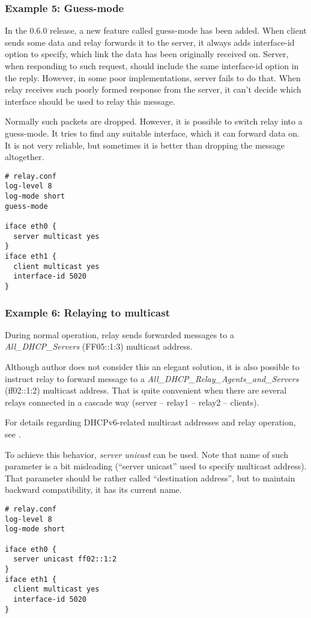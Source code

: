 \subsubsection{Example 5: Guess-mode}
In the 0.6.0 release, a new feature called guess-mode has been
added. When client sends some data and relay forwards it to the
server, it always adds interface-id option to specify, which link
the data has been originally received on. Server, when responding to
such request, should include the same interface-id option in the
reply. However, in some poor implementations, server fails to do
that. When relay receives such poorly formed response from the server,
it can't decide which interface should be used to relay this
message. 

Normally such packets are dropped. However, it is possible to switch
relay into a guess-mode. It tries to find any suitable interface,
which it can forward data on. It is not very reliable, but sometimes
it is better than dropping the message altogether.

\begin{lstlisting}
# relay.conf
log-level 8
log-mode short
guess-mode

iface eth0 {
  server multicast yes
}
iface eth1 {
  client multicast yes
  interface-id 5020
}
\end{lstlisting}

\subsubsection{Example 6: Relaying to multicast}
During normal operation, relay sends forwarded messages to a 
\emph{All\_DHCP\_Servers} (FF05::1:3) multicast address.

Although author does not consider this an elegant solution, it is also 
possible to instruct relay to forward message to a \emph{All\_DHCP\_Relay\_Agents\_and\_Servers}
(ff02::1:2) multicast address. That is quite convenient when there are several 
relays connected in a cascade way (server -- relay1 -- relay2 -- clients).

For details regarding DHCPv6-related multicast addresses and relay operation, see \cite{rfc3315}.

To achieve this behavior, \emph{server unicast} can be used. Note that
name of such parameter is a bit misleading (``server unicast'' used to specify
multicast address). That parameter should be rather called ``destination address'', 
but to maintain backward compatibility, it has its current name.

\begin{lstlisting}
# relay.conf
log-level 8
log-mode short

iface eth0 {
  server unicast ff02::1:2
}
iface eth1 {
  client multicast yes
  interface-id 5020
}
\end{lstlisting}
